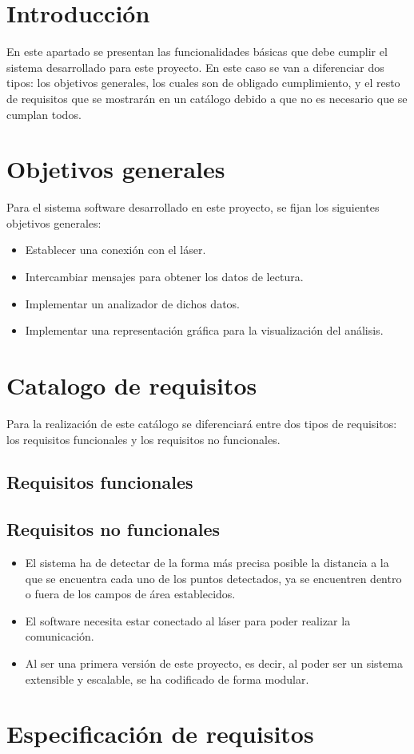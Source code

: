 
\section{Introducción}
En este apartado se presentan las funcionalidades básicas que debe cumplir el sistema desarrollado para este proyecto. En este caso se van a diferenciar dos tipos: los objetivos generales, los cuales son de obligado cumplimiento, y el resto de requisitos que se mostrarán en un catálogo debido a que  no es necesario que se cumplan todos.

\section{Objetivos generales}
Para el sistema software desarrollado en este proyecto, se fijan los siguientes objetivos generales:
\begin{itemize}
	\item Establecer una conexión con el láser.
	\item Intercambiar mensajes para obtener los datos de lectura.
	\item Implementar un analizador de dichos datos.
	\item Implementar una representación gráfica para la visualización del análisis.
\end{itemize}

\section{Catalogo de requisitos}
Para la realización de este catálogo se diferenciará entre dos tipos de requisitos: los requisitos funcionales y los requisitos no funcionales.
\subsection{Requisitos funcionales}

\subsection{Requisitos no funcionales}
\begin{itemize}
	\item El sistema ha de detectar de la forma más precisa posible la distancia a la que se encuentra cada uno de los puntos detectados, ya se encuentren dentro o fuera de los campos de área establecidos.
	\item El software necesita estar conectado al láser para poder realizar la comunicación.
	\item Al ser una primera versión de este proyecto, es decir, al poder ser un sistema extensible y escalable, se ha codificado de forma modular.
\end{itemize}
\section{Especificación de requisitos}


